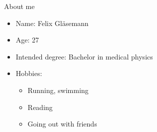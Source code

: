 \begin{frame}{\huge{About me}}
  \begin{itemize}
    \setlength\itemsep{1em}
    \item Name: Felix Gläsemann
    \item Age: 27
    \item Intended degree: Bachelor in medical physics
    \item Hobbies:
      \begin{itemize}
        \item[\rightarrow] Running, swimming
        \item[\rightarrow] Reading
        \item[\rightarrow] Going out with friends
      \end{itemize}
  \end{itemize}
\end{frame}
